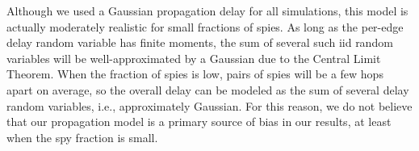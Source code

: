 Although we used a Gaussian propagation delay for all simulations, this model is actually moderately realistic for small fractions of spies. As long as the per-edge delay random variable has finite moments, the sum of several such iid random variables will be well-approximated by a Gaussian due to the Central Limit Theorem. When the fraction of spies is low, pairs of spies will be a few hops apart on average, so the overall delay can be modeled as the sum of several delay random variables, i.e., approximately Gaussian. For this reason, we do not believe that our propagation model is a primary source of bias in our results, at least when the spy fraction is small.